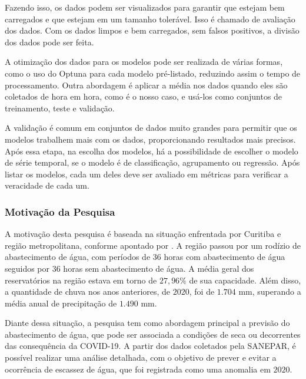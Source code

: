 Fazendo isso, os dados podem ser visualizados para garantir que estejam bem carregados e que estejam em um tamanho tolerável. Isso é chamado de avaliação dos dados. Com os dados limpos e bem carregados, sem falsos positivos, a divisão dos dados pode ser feita. 

A otimização dos dados para os modelos pode ser realizada de várias formas, como o uso do Optuna para cada modelo pré-listado, reduzindo assim o tempo de processamento. Outra abordagem é aplicar a média nos dados quando eles são coletados de hora em hora, como é o nosso caso, e usá-los como conjuntos de treinamento, teste e validação. 

A validação é comum em conjuntos de dados muito grandes para permitir que os modelos trabalhem mais com os dados, proporcionando resultados mais precisos. Após essa etapa, na escolha dos modelos, há a possibilidade de escolher o modelo de série temporal, se o modelo é de classificação, agrupamento ou regressão. Após listar os modelos, cada um deles deve ser avaliado em métricas para verificar a veracidade de cada um.



  
      
\subsubsection{Motiva\c c\~ao da Pesquisa} \label{subsubsec:motivacao}
 
 
A motivação desta pesquisa é baseada na situação enfrentada por Curitiba e região metropolitana, conforme apontado por \cite{vasconcelos_2020}. A região passou por um rodízio de abastecimento de água, com períodos de 36 horas com abastecimento de água seguidos por 36 horas sem abastecimento de água. A média geral dos reservatórios na região estava em torno de $27,96\%$ de sua capacidade. Além disso, a quantidade de chuva nos anos anteriores, de $2020$, foi de $1.704$ mm, superando a média anual de precipitação de $1.490$ mm.
 	
Diante dessa situação, a pesquisa tem como abordagem principal a previsão do abastecimento de água, que pode ser associada a condições de seca ou decorrentes das consequência da COVID-19. A partir dos dados coletados pela SANEPAR, é possível realizar uma análise detalhada, com o objetivo de prever e evitar a ocorrência de escassez de água, que foi registrada como uma anomalia em $2020$. 
    
     
    